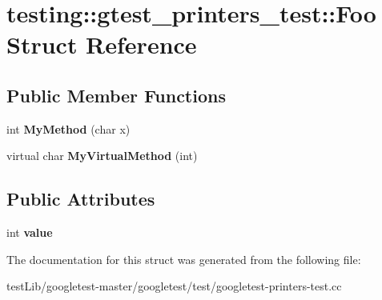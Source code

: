 \hypertarget{structtesting_1_1gtest__printers__test_1_1Foo}{}\section{testing\+:\+:gtest\+\_\+printers\+\_\+test\+:\+:Foo Struct Reference}
\label{structtesting_1_1gtest__printers__test_1_1Foo}
\subsection*{Public Member Functions}
\begin{DoxyCompactItemize}
\item 
\mbox{\label{structtesting_1_1gtest__printers__test_1_1Foo_a703c1159114f3a640b16d470a9613672}} 
int {\bfseries My\+Method} (char x)
\item 
\mbox{\label{structtesting_1_1gtest__printers__test_1_1Foo_a368dc5150b27c2aaca6034830334e1cd}} 
virtual char {\bfseries My\+Virtual\+Method} (int)
\end{DoxyCompactItemize}
\subsection*{Public Attributes}
\begin{DoxyCompactItemize}
\item 
\mbox{\label{structtesting_1_1gtest__printers__test_1_1Foo_a8171a69191d34071ea4448d2dda501ec}} 
int {\bfseries value}
\end{DoxyCompactItemize}


The documentation for this struct was generated from the following file\+:\begin{DoxyCompactItemize}
\item 
test\+Lib/googletest-\/master/googletest/test/googletest-\/printers-\/test.\+cc\end{DoxyCompactItemize}
